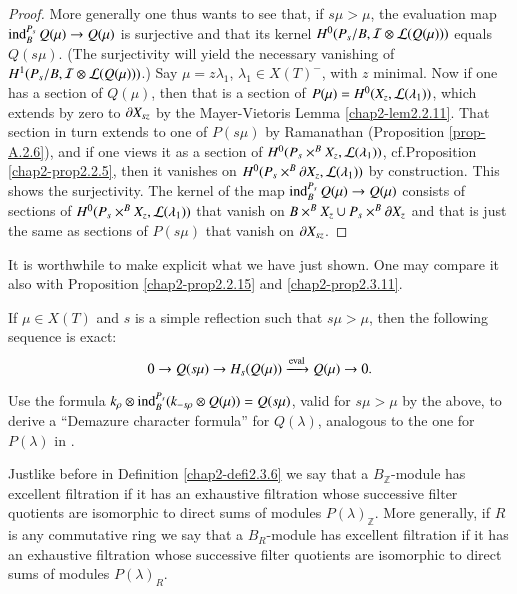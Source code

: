 \begin{proof}
More generally one thus wants to see that, if $s\mu>\mu$, the
evaluation map $\operatorname{ind}^{P_{s}}_{B}Q(\mu)\to Q(\mu)$ is surjective and
that its kernel $H^{0}(P_{s}/B,\mathcal{I}\otimes \mathcal{L}(Q(\mu)))$ equals
$Q(s\mu)$. (The surjectivity will yield the necessary vanishing of
$H^{1}(P_{s}/B,\mathcal{I}\otimes\mathcal{L}(Q(\mu)))$.) Say $\mu=z\lambda_{1}$,
$\lambda_{1}\in X(T)^{-}$, with $z$ minimal. Now if one has a section
of $Q(\mu)$, then that is a section of
$P(\mu)=H^{0}(X_{z},\mathcal{L}(\lambda_{1}))$, which extends by zero to $\partial
X_{sz}$ by the Mayer-Vietoris Lemma \ref{chap2-lem2.2.11}. That
section in turn extends to one of $P(s\mu)$ by Ramanathan (Proposition
\ref{prop-A.2.6}), and if one views it as a section of
$H^{0}(P_{s}\times^{B}X_{z},\mathcal{L}(\lambda_{1}))$, cf.\@ Proposition
\ref{chap2-prop2.2.5}, then it vanishes on $H^{0}(P_{s}\times^{B}\partial
X_{z},\mathcal{L}(\lambda_{1}))$ by construction. This shows the
surjectivity. The kernel of the map $\operatorname{ind}^{P_{s}}_{B}Q(\mu)\to Q(\mu)$
consists of sections of $H^{0}(P_{s}\times^{B}X_{z},\mathcal{L}(\lambda_{1}))$
that vanish on $B\times^{B}X_{z}\cup P_{s}\times^{B}\partial X_{z}$ and that
is just the same as sections of $P(s\mu)$ that vanish on $\partial X_{sz}$. 
\end{proof}

It is worthwhile to make explicit what we have just shown. One may
compare it also with Proposition \ref{chap2-prop2.2.15} and
\ref{chap2-prop2.3.11}. 

\begin{lemma}\label{chap7-lem7.2.3}
If $\mu\in X(T)$ and $s$ is a simple reflection such that $s\mu>\mu$,
then the following sequence is exact:
$$
0\to Q(s\mu)\to H_{s}(Q(\mu))\xrightarrow{\operatorname{eval}}Q(\mu)\to 0.
$$
\end{lemma}

\begin{exercise}\label{chap7-exer7.2.4}
Use the formula $k_{\rho}\otimes \operatorname{ind}^{P_{s}}_{B}(k_{-s\rho}\otimes
Q(\mu))=Q(s\mu)$, valid for $s\mu>\mu$ by the above, to derive a
``Demazure character formula'' for $Q(\lambda)$, analogous to the one
for $P(\lambda)$ in \cite[II Proposition 14.18]{key11}.
\end{exercise}

\begin{definition}\label{chap7-defi7.2.5}
Just\pageoriginale like\label{page72} before in Definition \ref{chap2-defi2.3.6} we say that a
$B_{\mathbb{Z}}$-module has excellent filtration if it has an
exhaustive filtration whose successive filter quotients are isomorphic
to direct sums of modules $P(\lambda)_{\mathbb{Z}}$. More generally,
if $R$ is any commutative ring we say that a $B_{R}$-module has
excellent filtration if it has an exhaustive filtration whose
successive filter quotients are isomorphic to direct sums of modules
$P(\lambda)_{R}$. 
\end{definition}

